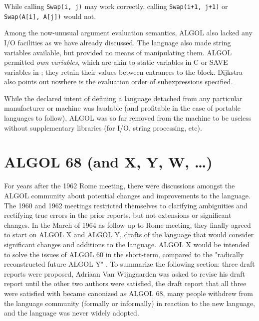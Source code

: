 

While calling \texttt{Swap(i, j)} may work correctly, calling
\texttt{Swap(i+1, j+1)} or \texttt{Swap(A[i], A[j])} would not.

Among the now-unusual argument evaluation semantics, ALGOL also lacked any I/O 
facilities as we have already discussed.  The language also made string 
variables available, but provided no means of manipulating them.  ALGOL 
permitted \textit{own variables}, which are akin to static variables in C or 
SAVE variables in \FTN{}; they retain their values between entrances to the 
block.  Dijkstra also points out nowhere is the evaluation order of 
subexpressions specified\cite{dijkstra_defense_of_algol_60_1961}.

While the declared intent of defining a language detached from any particular
manufacturer or machine was laudable (and profitable in the case of portable 
languages to follow), ALGOL was so far removed from the machine to be useless without
supplementary libraries (for I/O, string processing, etc).

\section{ALGOL 68 (and X, Y, W, \dots)}

For years after the 1962 Rome meeting, there were discussions amongst the ALGOL
community about potential changes and improvements to the language.
The 1960 and 1962 meetings restricted themselves to clarifying ambiguities
and rectifying true errors in the prior reports, but not extensions or
significant changes.
In the March of 1964 as follow up to Rome meeting, they finally agreed to
start on ALGOL X and ALGOL Y, drafts of the language that would consider
significant changes and additions to the language.
ALGOL X would be intended to solve the issues of ALGOL 60 in the short-term,
compared to the "radically reconstructed future ALGOL Y"
\cite{cleaning_up_algol60_duncan_wijngaarden_1964}.
To summarize the following section: three draft reports were proposed,
Adriaan Van Wijngaarden was asked to revise his draft report until the other
two authors were satisfied,
the draft report that all three were satisfied with became canonized as ALGOL 68,
many people withdrew from the language community (formally or informally)
in reaction to the new language,
and the language was never widely adopted.




